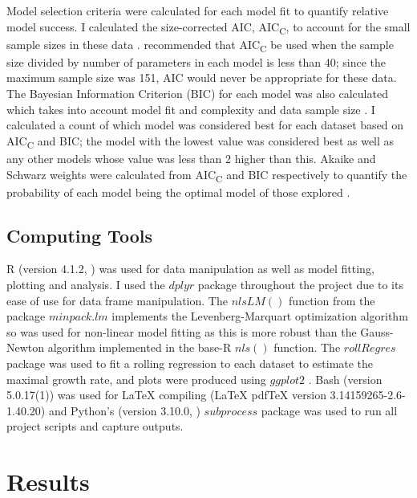 \documentclass[11pt]{article}
\begin{document}
\begin{linenumbers}
            Model selection criteria were calculated for each model fit to quantify relative model success. I calculated the size-corrected AIC, AIC\textsubscript{C}, to account for the small sample sizes in these data \citep{yang_4_2019}. \citet[p.~445]{burnham_model_2002} recommended that AIC\textsubscript{C} be used when the sample size divided by number of parameters in each model is less than 40; since the maximum sample size was 151, AIC would never be appropriate for these data. The Bayesian Information Criterion (BIC) for each model was also calculated which takes into account model fit and complexity and data sample size \citep{johnson_model_2004}. I calculated a count of which model was considered best for each dataset based on AIC\textsubscript{C} and BIC; the model with the lowest value was considered best as well as any other models whose value was less than 2 higher than this. Akaike and Schwarz weights were calculated from AIC\textsubscript{C} and BIC respectively to quantify the probability of each model being the optimal model of those explored \citep{wagenmakers_aic_2004}.


        \subsection{Computing Tools}
        
            R (version 4.1.2, \citet{R_language_2021}) was used for data manipulation as well as model fitting, plotting and analysis. I used the $dplyr$ package \citep{dplyr_2021} throughout the project due to its ease of use for data frame manipulation. The $nlsLM()$ function from the package $minpack.lm$ \citep{minpack_2016} implements the Levenberg-Marquart optimization algorithm so was used for non-linear model fitting as this is more robust than the Gauss-Newton algorithm implemented in the base-R $nls()$ function. The $rollRegres$ package \citep{roll_Regres_2019} was used to fit a rolling regression to each dataset to estimate the maximal growth rate, and plots were produced using $ggplot2$ \citep{ggplot_2016}. Bash (version 5.0.17(1)) was used for LaTeX compiling (LaTeX pdfTeX version 3.14159265-2.6-1.40.20) and Python's (version 3.10.0, \citet{python_2009}) $subprocess$ package was used to run all project scripts and capture outputs. 
            

    \section{Results}
        

\end{linenumbers}
\end{document}
